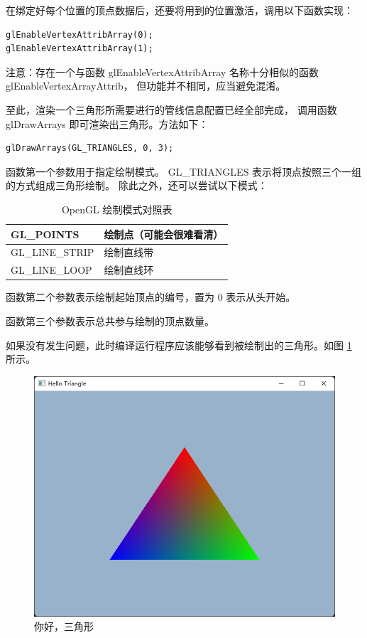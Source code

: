 \documentclass[fontset=windows]{ctexart}
\begin{document}
在绑定好每个位置的顶点数据后，还要将用到的位置激活，调用以下函数实现：

\begin{lstlisting}
glEnableVertexAttribArray(0);
glEnableVertexAttribArray(1);
\end{lstlisting}

注意：存在一个与函数 glEnableVertexAttribArray 名称十分相似的函数 glEnableVertexArrayAttrib，
但功能并不相同，应当避免混淆。

至此，渲染一个三角形所需要进行的管线信息配置已经全部完成，
调用函数 glDrawArrays 即可渲染出三角形。方法如下：

\begin{lstlisting}
glDrawArrays(GL_TRIANGLES, 0, 3);
\end{lstlisting}

函数第一个参数用于指定绘制模式。
GL\_TRIANGLES 表示将顶点按照三个一组的方式组成三角形绘制。
除此之外，还可以尝试以下模式：

\begin{table}[htbp]
    \centering
    \begin{tabular}{|l|l|}
        \hline
        GL\_POINTS&绘制点（可能会很难看清）\\
        \hline
        GL\_LINE\_STRIP&绘制直线带\\
        \hline
        GL\_LINE\_LOOP&绘制直线环\\
        \hline
    \end{tabular}
    \caption{OpenGL 绘制模式对照表}
\end{table}

函数第二个参数表示绘制起始顶点的编号，置为 0 表示从头开始。

函数第三个参数表示总共参与绘制的顶点数量。

如果没有发生问题，此时编译运行程序应该能够看到被绘制出的三角形。如图 \ref{fig-gl:hello-triangle} 所示。

\begin{figure}[htbp]
\centering
\includegraphics[width=0.5\linewidth]{imgs/sec 3.3/hello-triangle.png}
\caption{你好，三角形}
\label{fig-gl:hello-triangle}
\end{figure}
\end{document}
